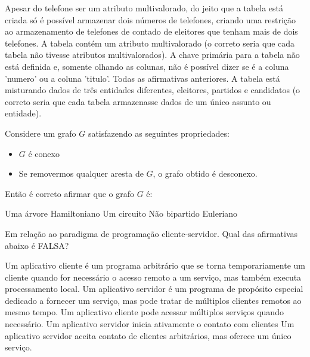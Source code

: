 \documentclass[12pt, addpoints]{exam}
\begin{document}
\begin{questions}
\begin{choices}
\choice Apesar do telefone ser um atributo multivalorado, do jeito que a tabela está criada só é possível armazenar dois números de telefones, criando uma restrição ao armazenamento de telefones de contado de eleitores que tenham mais de dois telefones.
\choice A tabela contém um atributo multivalorado (o correto seria que cada tabela não tivesse atributos multivalorados).
\choice A chave primária para a tabela não está definida e, somente olhando as colunas, não é possível dizer se é a coluna 'numero' ou a coluna 'titulo'.
\choice Todas as afirmativas anteriores.
\choice A tabela está misturando dados de três entidades diferentes, eleitores, partidos e candidatos (o correto seria que cada tabela armazenasse dados de um único assunto ou entidade).
\end{choices}

\question

Considere um grafo \( G \) satisfazendo as seguintes propriedades:



\begin{itemize}

    \item \( G \) é conexo

    \item Se removermos qualquer aresta de \( G \), o grafo obtido é desconexo.

\end{itemize}



Então é correto afirmar que o grafo \( G \) é:
\begin{choices}
\choice Uma árvore
\choice Hamiltoniano
\choice Um circuito
\choice Não bipartido
\choice Euleriano
\end{choices}

\question

Em relação ao paradigma de programação cliente-servidor. Qual das afirmativas abaixo é FALSA?
\begin{choices}
\choice Um aplicativo cliente é um programa arbitrário que se torna temporariamente um cliente quando for necessário o acesso remoto a um serviço, mas também executa processamento local.
\choice Um aplicativo servidor é um programa de propósito especial dedicado a fornecer um serviço, mas pode tratar de múltiplos clientes remotos ao mesmo tempo. 
\choice Um aplicativo cliente pode acessar múltiplos serviços quando necessário.
\choice Um aplicativo servidor inicia ativamente o contato com clientes 
\choice Um aplicativo servidor aceita contato de clientes arbitrários, mas oferece um único serviço. 
\end{choices}


\end{questions}
\end{document}
